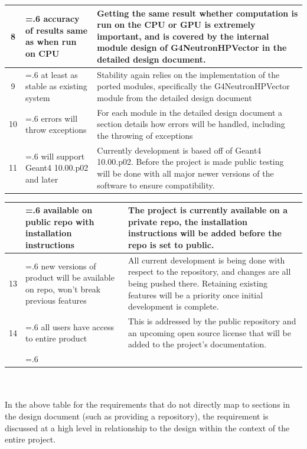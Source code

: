\documentclass[12pt]{article}
\begin{document}
\begin{table}[h]
\begin{tabularx}{\textwidth}{c>{\hsize=.6\hsize}X>{\hsize=1.4\hsize}X}
8 & accuracy of results same as when run on CPU & Getting the same result whether computation is run on the CPU or GPU is extremely important, and is covered by the internal module design of G4NeutronHPVector in the detailed design document.\\\hline

9 & at least as stable as existing system & Stability again relies on the implementation of the ported modules, specifically the G4NeutronHPVector module from the detailed design document\\\hline

10 & errors will throw exceptions & For each module in the detailed design document a section details how errors will be handled, including the throwing of exceptions\\\hline

11 & will support Geant4 10.00.p02 and later & Currently development is based off of Geant4 10.00.p02. Before the project is made public testing will be done with all major newer versions of the software to ensure compatibility.\\\hline
\end{tabularx}
\end{table}

\clearpage
\begin{tabularx}{\textwidth}{c>{\hsize=.6\hsize}X>{\hsize=1.4\hsize}X}
\arrayrulecolor{lightgray}
\hline
12 & available on public repo with installation instructions & The project is currently available on a private repo, the installation instructions will be added before the repo is set to public.\\\hline

13 & new versions of product will be available on repo, won't break previous features & All current development is being done with respect to the repository, and changes are all being pushed there. Retaining existing features will be a priority once initial development is complete.\\\hline

14 & all users have access to entire product & This is addressed by the public repository and an upcoming open source license that will be added to the project's documentation.\\
\arrayrulecolor{black}
\bottomrule
\end{tabularx}\\\\

In the above table for the requirements that do not directly map to sections in the design document (such as providing a repository), the requirement is discussed at a high level in relationship to the design within the context of the entire project.
\end{document}
